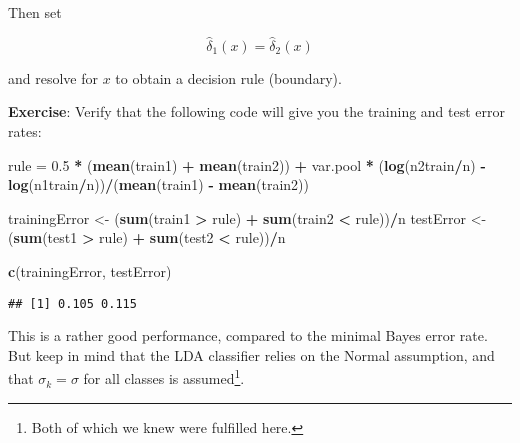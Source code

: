 \documentclass[10pt,ignorenonframetext,]{beamer}
\newenvironment{Shaded}{\begin{snugshade}}{\end{snugshade}}
\newcommand{\FloatTok}[1]{\textcolor[rgb]{0.00,0.00,0.81}{#1}}
\newcommand{\KeywordTok}[1]{\textcolor[rgb]{0.13,0.29,0.53}{\textbf{#1}}}
\newcommand{\NormalTok}[1]{#1}
\newcommand{\OperatorTok}[1]{\textcolor[rgb]{0.81,0.36,0.00}{\textbf{#1}}}
\newcommand{\StringTok}[1]{\textcolor[rgb]{0.31,0.60,0.02}{#1}}
\begin{document}
\begin{frame}[fragile]

Then set

\[\hat\delta_1(x) = \hat\delta_2(x)\]

and resolve for \(x\) to obtain a decision rule (boundary).

\vspace{2mm}

\textbf{Exercise}: Verify that the following code will give you the
training and test error rates:

\vspace{2mm}

\scriptsize

\begin{Shaded}
\begin{Highlighting}[]
\NormalTok{rule =}\StringTok{ }\FloatTok{0.5} \OperatorTok{*}\StringTok{ }\NormalTok{(}\KeywordTok{mean}\NormalTok{(train1) }\OperatorTok{+}\StringTok{ }\KeywordTok{mean}\NormalTok{(train2)) }\OperatorTok{+}\StringTok{ }\NormalTok{var.pool }\OperatorTok{*}\StringTok{ }\NormalTok{(}\KeywordTok{log}\NormalTok{(n2train}\OperatorTok{/}\NormalTok{n) }\OperatorTok{-}\StringTok{ }
\StringTok{    }\KeywordTok{log}\NormalTok{(n1train}\OperatorTok{/}\NormalTok{n))}\OperatorTok{/}\NormalTok{(}\KeywordTok{mean}\NormalTok{(train1) }\OperatorTok{-}\StringTok{ }\KeywordTok{mean}\NormalTok{(train2))}

\NormalTok{trainingError <-}\StringTok{ }\NormalTok{(}\KeywordTok{sum}\NormalTok{(train1 }\OperatorTok{>}\StringTok{ }\NormalTok{rule) }\OperatorTok{+}\StringTok{ }\KeywordTok{sum}\NormalTok{(train2 }\OperatorTok{<}\StringTok{ }\NormalTok{rule))}\OperatorTok{/}\NormalTok{n}
\NormalTok{testError <-}\StringTok{ }\NormalTok{(}\KeywordTok{sum}\NormalTok{(test1 }\OperatorTok{>}\StringTok{ }\NormalTok{rule) }\OperatorTok{+}\StringTok{ }\KeywordTok{sum}\NormalTok{(test2 }\OperatorTok{<}\StringTok{ }\NormalTok{rule))}\OperatorTok{/}\NormalTok{n}

\KeywordTok{c}\NormalTok{(trainingError, testError)}
\end{Highlighting}
\end{Shaded}

\begin{verbatim}
## [1] 0.105 0.115
\end{verbatim}

\normalsize

This is a rather good performance, compared to the minimal Bayes error
rate. But keep in mind that the LDA classifier relies on the Normal
assumption, and that \(\sigma_k=\sigma\) for all classes is
assumed\footnote{Both of which we knew were fulfilled here.}.

\end{frame}
\end{document}
